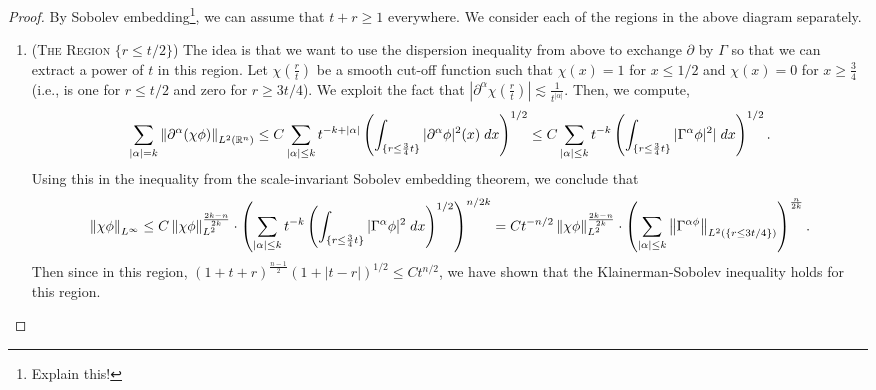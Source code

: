 \documentclass{article}
\begin{document}
\begin{proof}
	By Sobolev embedding\footnote{Explain this!}, we can assume that $t + r\geq 1$ everywhere. We consider each of the regions in the above diagram separately. \vspace{-0.25cm}
	\begin{enumerate}[itemsep =-2pt,label = (\Roman{*})]
		\item (\textsc{The Region $\{r \leq t/2\}$}) The idea is that we want to use the dispersion inequality from above to exchange $\partial$ by $\Gamma$ so that we can extract a power of $t$ in this region. Let $\chi\left(\frac{r}{t}\right)$ be a smooth cut-off function such that $\chi(x) = 1$ for $x \leq 1/2$ and $\chi(x) = 0$ for $x \geq \frac{3}{4}$ (i.e., is one for $r \leq t/2$ and zero for $r \geq 3t/4$). We exploit the fact that $|\partial^{\alpha}\chi\left(\frac{r}{t}\right)| \lesssim \frac{1}{t^{|\alpha|}}$. Then, we compute, 
		\begin{equation*}
			\sum_{|\alpha| = k}\left\Vert \partial^{\alpha}(\chi\phi) \right\Vert_{L^{2}(\mathbb{R}^{n})} \leq C \sum_{|\alpha|\leq k}	t^{-k + |\alpha|}\left(\int_{\{r \leq \frac{3}{4}t\}}|\partial^{\alpha}\phi|^{2}(x)\;dx\right)^{1/2} \leq C\sum_{|\alpha|\leq k}t^{-k}\left(\int_{\{r \leq \frac{3}{4}t\}}|\Gamma^{\alpha}\phi|^{2}|\;dx\right)^{1/2}. 
		\end{equation*}
		Using this in the inequality from the scale-invariant Sobolev embedding theorem, we conclude that 
		\begin{equation*}
			\left\Vert \chi\phi \right\Vert_{L^{\infty}} \leq C \left\Vert \chi\phi \right\Vert_{L^{2}}^{\frac{2k -n}{2k}} \cdot \left(\sum_{|\alpha| \leq k}t^{-k}\left(\int_{\{r \leq \frac{3}{4}t\}}|\Gamma^{\alpha}\phi|^{2}\;dx\right)^{1/2}\right)^{n/2k} = Ct^{-n/2}\left\Vert \chi\phi \right\Vert_{L^{2}}^{\frac{2k - n}{2k}} \cdot \left(\sum_{|\alpha|\leq k}\left\Vert \Gamma^{\alpha\phi} \right\Vert_{L^{2}(\{r \leq 3t/4\})}\right)^{\frac{n}{2k}}. 
		\end{equation*}
		Then since in this region, $(1 + t + r)^{\frac{n-1}{2}}(1 + |t - r|)^{1/2} \leq Ct^{n/2}$, we have shown that the Klainerman-Sobolev inequality holds for this region. 
		

\end{enumerate}
\end{proof}
\end{document}
